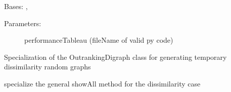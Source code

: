 \documentclass[letterpaper,10pt,english]{sphinxmanual}
\begin{document}

\begin{fulllineitems}
\label{techDoc:outrankingDigraphs.DissimilarityOutrankingDigraph}
Bases: {\hyperref[techDoc:outrankingDigraphs.OutrankingDigraph]{}}, {\hyperref[techDoc:perfTabs.PerformanceTableau]{}}
\begin{description}
\item[{Parameters:}] \leavevmode
performanceTableau (fileName of valid py code)

\end{description}

Specialization of the OutrankingDigraph class for generating
temporary dissimilarity random graphs

\begin{fulllineitems}
\label{techDoc:outrankingDigraphs.DissimilarityOutrankingDigraph.showAll}
specialize the general showAll method for the dissimilarity case

\end{fulllineitems}


\end{fulllineitems}

\end{document}
